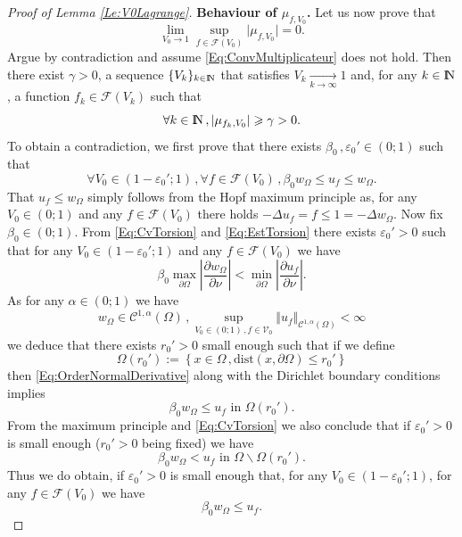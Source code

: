 \documentclass{article}
\newcommand{\N}{\textnormal{I\kern-0.21emN}}
\renewcommand{\geq}{\geqslant}
\renewcommand{\leq}{\leqslant}
\def\e{{\varepsilon}}
\def\O{{\Omega}}
\numberwithin{equation}{section}
\begin{document}
\begin{proof}[Proof of Lemma \ref{Le:V0Lagrange}]
%
\textbf{Behaviour of $\mu_{f,V_0}$.}
Let us now prove that 
\begin{equation}\label{Eq:ConvMultiplicateur}\lim_{V_0\to 1}\sup_{f\in \mathcal F(V_0)}\vert \mu_{f,V_0}\vert=0.\end{equation}
Argue by contradiction and assume \eqref{Eq:ConvMultiplicateur} does not hold. 
Then there exist $\gamma>0$, a sequence $\{V_k\}_{k\in \N}$  that satisfies $V_k\underset{k\to \infty}\rightarrow 1$ and, for any $k\in \N$, a function $f_k\in \mathcal F(V_k)$ such that 
\begin{equation}\label{Eq:ConvMultiplicateurContrad}
\forall k\in \N\,, \vert \mu_{f_k,V_0}\vert \geq \gamma>0.
\end{equation}
To obtain a contradiction, we first prove that there exists $\beta_0\,, \e_0'\in (0;1)$ such that
\[ \forall V_0\in (1-\e_0'; 1)\,, \forall f \in \mathcal F(V_0)\,,  \beta_0 w_\Omega \leq u_f\leq w_\O.
\]That $u_f\leq w_\O$ simply follows from the Hopf maximum principle as, for any $V_0\in (0;1)$ and any $f\in \mathcal F(V_0)$ there holds $-\Delta u_f=f\leq1= -\Delta w_\O$. Now fix $\beta_0\in (0;1)$. From \eqref{Eq:CvTorsion} and \eqref{Eq:EstTorsion} there exists $\e_0'>0$ such that for any $V_0\in (1-\e_0';1)$ and any $f\in \mathcal F(V_0)$ we have 
\begin{equation}\label{Eq:OrderNormalDerivative}\beta_0 \max_{\partial \O}\left|\frac{\partial w_\O}{\partial \nu}\right|<\min_{\partial \O}\left|\frac{\partial u_f}{\partial \nu}\right|.
\end{equation} As for any $\alpha \in (0;1)$ we have 
\[ w_\O \in \mathscr C^{1,\alpha}(\O)\,, \sup_{V_0\in (0;1)\,, {f \in \mathcal V_0} }\Vert u_f\Vert_{\mathscr C^{1,\alpha}(\O)}<\infty\] we deduce that there exists $r_0'>0$ small enough such that if we define 
\begin{equation}\label{Eq:Or0} \Omega(r_0'):=\left\{ x \in \O\,, \mathrm{dist}(x,\partial \O)\leq r_0'\right\}\end{equation} then \eqref{Eq:OrderNormalDerivative} along with the Dirichlet boundary conditions implies 
\[\beta_0 w_\O\leq u_f \text{ in }\O(r_0').
\]
From the maximum principle and \eqref{Eq:CvTorsion} we also conclude that if $\e_0'>0$ is small enough  ($r_0'>0$ being fixed) we have 
\[ \beta_0 w_\O<u_f \text{ in }\O\backslash \Omega(r_0').\] Thus we do obtain, if $\e_0'>0$ is small enough that, for any $V_0\in (1-\e_0';1)$, for any $f\in \mathcal F(V_0)$ we have 
\begin{equation}\label{Eq:OrderTorsion}\beta_0 w_\Omega \leq u_f.

\end{equation}
\end{proof}
\end{document}
